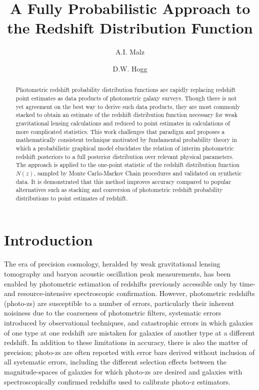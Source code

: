 \documentclass[preprint]{aastex}
\begin{document}
\title{A Fully Probabilistic Approach to the Redshift Distribution Function}

\author{A.I. Malz}

\author{D.W. Hogg}


\begin{abstract}
Photometric redshift probability distribution functions are rapidly replacing 
redshift point estimates as data products of photometric galaxy surveys.  
Though there is not yet agreement on the best way to derive such data products, 
they are most commonly stacked to obtain an estimate of the redshift 
distribution function necessary for weak gravitational lensing calculations and 
reduced to point estimates in calculations of more complicated statistics.  
This work challenges that paradigm and proposes a mathematically consistent 
technique motivated by fundamental probability theory in which a probabilistic 
graphical model elucidates the relation of interim photometric redshift 
posteriors to a full posterior distribution over relevant physical parameters.  
The approach is applied to the one-point statistic of the redshift distribution 
function $N(z)$, sampled by Monte Carlo-Markov Chain procedures and validated 
on synthetic data.  It is demonstrated that this method improves accuracy 
compared to popular alternatives such as stacking and conversion of photometric 
redshift probability distributions to point estimates of redshift.
\end{abstract}


\clearpage
\section{Introduction}
\label{sec:intro}

The era of precision cosmology, heralded by weak gravitational lensing 
tomography and baryon acoustic oscillation peak measurements, has been enabled 
by photometric estimation of redshifts previously accessible only by time- and 
resource-intensive spectroscopic confirmation.  However, photometric redshifts 
(photo-zs) are susceptible to a number of errors, particularly their inherent 
noisiness due to the coarseness of photometric filters, systematic errors 
introduced by observational techniques, and catastrophic errors in which 
galaxies of one type at one redshift are mistaken for galaxies of another type 
at a different redshift.  In addition to these limitations in accuracy, there 
is also the matter of precision; photo-zs are often reported with error bars 
derived without inclusion of all systematic errors, including the different 
selection effects between the magnitude-spaces of galaxies for which photo-zs 
are desired and galaxies with spectroscopically confirmed redshifts used to 
calibrate photo-z estimators.
\end{document}
